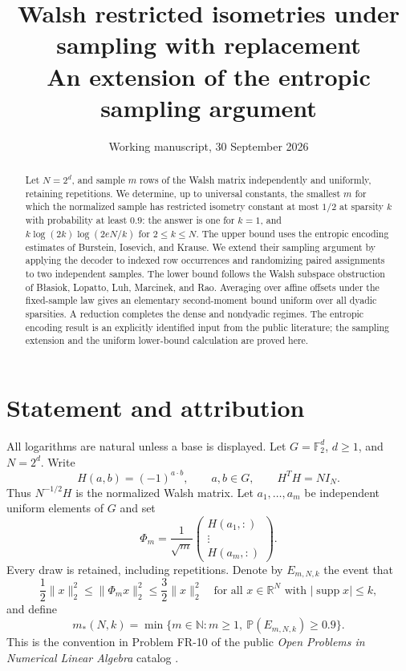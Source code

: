 \documentclass[11pt]{article}
\title{Walsh restricted isometries under sampling with replacement\\[4pt]
\large An extension of the entropic sampling argument}
\author{}
\date{Working manuscript, 30 September 2026}
\theoremstyle{remark}
\newcommand{\Prob}{\mathbb P}
\newcommand{\F}{\mathbb F}
\newcommand{\R}{\mathbb R}
\newcommand{\1}{\mathbf 1}
\newcommand{\supp}{\operatorname{supp}}
\begin{document}
\maketitle

\begin{abstract}
Let $N=2^d$, and sample $m$ rows of the Walsh matrix independently and
uniformly, retaining repetitions. We determine, up to universal constants,
the smallest $m$ for which the normalized sample has restricted isometry
constant at most $1/2$ at sparsity $k$ with probability at least $0.9$:
the answer is one for $k=1$, and
$k\log(2k)\log(2eN/k)$ for $2\leq k\leq N$.
The upper bound uses the entropic encoding estimates of Burstein,
Iosevich, and Krause. We extend their sampling argument by applying the
decoder to indexed row occurrences and randomizing paired assignments to
two independent samples. The lower bound follows the Walsh subspace
obstruction of B{\l}asiok, Lopatto, Luh, Marcinek, and Rao. Averaging over
affine offsets under the fixed-sample law gives an elementary second-moment
bound uniform over all dyadic sparsities. A reduction completes the dense
and nondyadic regimes. The entropic encoding result is an explicitly
identified input from the public literature; the sampling extension and
the uniform lower-bound calculation are proved here.
\end{abstract}

\section{Statement and attribution}

All logarithms are natural unless a base is displayed. Let $G=\F_2^d$,
$d\geq1$, and $N=2^d$. Write
\[
 H(a,b)=(-1)^{a\cdot b},\qquad a,b\in G,
 \qquad H^TH=NI_N.
\]
Thus $N^{-1/2}H$ is the normalized Walsh matrix. Let
$a_1,\ldots,a_m$ be independent uniform elements of $G$ and set
\begin{equation}\label{eq:sample}
 \Phi_m=\frac1{\sqrt m}
 \begin{pmatrix}H(a_1,:)\\ \vdots\\H(a_m,:)\end{pmatrix}.
\end{equation}
Every draw is retained, including repetitions. Denote by $E_{m,N,k}$ the
event that
\begin{equation}\label{eq:rip}
 \frac12\|x\|_2^2\leq\|\Phi_m x\|_2^2\leq\frac32\|x\|_2^2
 \quad\text{for all }x\in\R^N\text{ with }|\supp x|\leq k,
\end{equation}
and define
\[
 m_*(N,k)=\min\{m\in\mathbb N:m\geq1,\ \Prob(E_{m,N,k})\geq0.9\}.
\]
This is the convention in Problem FR-10 of the public
\emph{Open Problems in Numerical Linear Algebra} catalog \cite{FR10}.
\end{document}

